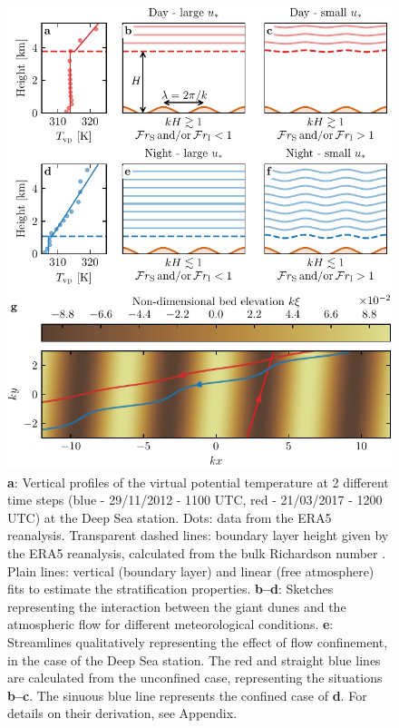   \begin{figure}
    \centering
    \includegraphics[scale=1]{Figures/Figure4.pdf}
    \caption{\textbf{a}: Vertical profiles of the virtual potential temperature at 2 different time steps (blue - 29/11/2012 - 1100 UTC, red - 21/03/2017 - 1200 UTC) at the Deep Sea station. Dots: data from the ERA5 reanalysis. Transparent dashed lines: boundary layer height given by the ERA5 reanalysis, calculated from the bulk Richardson number \citep{seidel2012}. Plain lines: vertical (boundary layer) and linear (free atmosphere) fits to estimate the stratification properties. \textbf{b--d}: Sketches representing the interaction between the giant dunes and the atmospheric flow for different meteorological conditions. \textbf{e}: Streamlines qualitatively representing the effect of flow confinement, in the case of the Deep Sea station. The red and straight blue lines are calculated from the unconfined case, representing the situations \textbf{b--c}. The sinuous blue line represents the confined case of \textbf{d}. For details on their derivation, see Appendix.}
    \label{Fig4}
  \end{figure}

